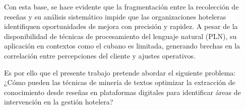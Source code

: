 	Con esta base, se hace evidente que la fragmentación entre la recolección de reseñas y su análisis sistemático impide que las organizaciones hoteleras identifiquen oportunidades de mejora con precisión y rapidez. A pesar de la disponibilidad de técnicas de procesamiento del lenguaje natural (PLN), su aplicación en contextos como el cubano es limitada, generando brechas en la correlación entre percepciones del cliente y ajustes operativos.
	
	Es por ello que el presente trabajo pretende abordar el siguiente problema: 
	¿Cómo pueden las técnicas de minería de textos optimizar la extracción de conocimiento desde reseñas en plataformas digitales para identificar áreas de intervención en la gestión hotelera?
	
